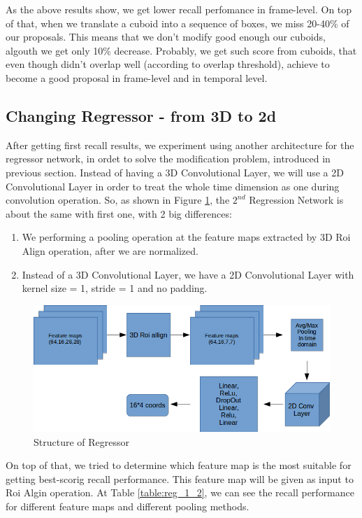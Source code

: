 \documentclass{report}
\begin{document}
As the above results show, we get lower recall perfomance in frame-level. On top of that, when we translate a cuboid into
a sequence of boxes, we miss 20-40\% of our proposals. This means that we don't modify good enough our cuboids, algouth
we get only 10\% decrease. Probably, we get such score from cuboids, that even though didn't overlap well (according to
overlap threshold), achieve to become a good proposal in frame-level and in temporal level. 


\subsection{Changing Regressor - from 3D to 2d}
After getting first recall results, we experiment using another architecture for the regressor network, in ordet to solve the modification
problem, introduced in previous section. Instead of having a 3D Convolutional Layer, we will use a 2D Convolutional Layer
in order to treat the whole time dimension as one during convolution operation. So, as shown in Figure \ref{fig:reg_1_2},
the $2^{nd}$ Regression Network is about the same with first one, with 2 big differences:
\begin{enumerate}
\item We performing a pooling operation at the feature maps extracted by 3D Roi Align operation, after we are normalized.
\item Instead of a 3D Convolutional Layer, we have a 2D Convolutional Layer with kernel size = 1, stride = 1 and no padding.
\end{enumerate}

\begin{figure}[h]

  \centering
  \includegraphics[scale=0.48]{regressor_1_2}
  \caption{Structure of Regressor}
  \label{fig:reg_1_2}
\end{figure}

On top of that, we tried to determine which feature map is the most suitable  for getting best-scorig recall performance. This feature map will be given as
input to Roi Algin operation.  At Table \ref{table:reg_1_2}, we can see the recall performance for different feature maps and different pooling methods.
\end{document}
